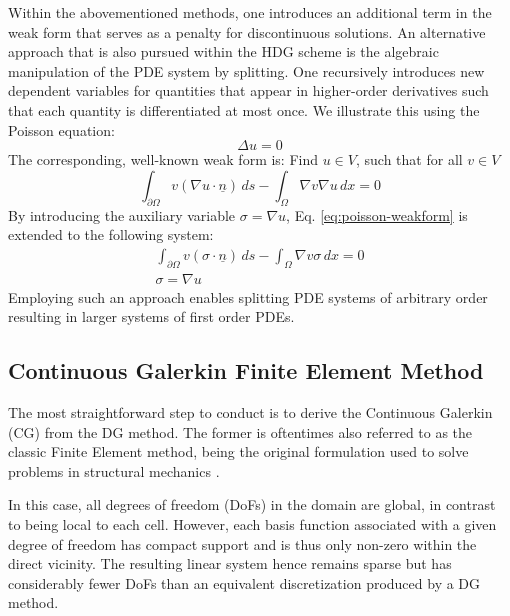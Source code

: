 \documentclass[asi,article,submit,moreauthors]{Definitions/mdpi}
\begin{document}
Within the abovementioned methods, one introduces an additional term in the weak form that serves as a penalty for discontinuous solutions.
An alternative approach that is also pursued within the HDG scheme is the algebraic manipulation of the PDE system by splitting.
One recursively introduces new dependent variables for quantities that appear in higher-order derivatives such that each quantity is differentiated at most once.
We illustrate this using the Poisson equation:
\begin{equation}
    \Delta u = 0
\end{equation}
The corresponding, well-known weak form is: Find $u \in V$, such that for all $v \in V$
\begin{equation}\label{eq:poisson-weakform}
    \int_{\partial\Omega} v (\nabla u \cdot \underline{n}) \,ds - \int_\Omega \nabla v \nabla u \,dx = 0
\end{equation}
By introducing the auxiliary variable $\sigma = \nabla u$, Eq. \ref{eq:poisson-weakform} is extended to the following system:
\begin{align}
    \int_{\partial\Omega} v (\sigma \cdot \underline{n}) \,ds - \int_\Omega \nabla v \sigma \,dx = 0 \\
    \sigma = \nabla u
\end{align}
Employing such an approach enables splitting PDE systems of arbitrary order resulting in larger systems of first order PDEs.

\subsection{Continuous Galerkin Finite Element Method}

The most straightforward step to conduct is to derive the Continuous Galerkin (CG) from the DG method.
The former is oftentimes also referred to as the classic Finite Element method, being the original formulation used to solve problems in structural mechanics \cite{liuEightyYearsFinite2022}.

In this case, all degrees of freedom (DoFs) in the domain are global, in contrast to being local to each cell.
However, each basis function associated with a given degree of freedom has compact support and is thus only non-zero within the direct vicinity.
The resulting linear system hence remains sparse but has considerably fewer DoFs than an equivalent discretization produced by a DG method.
\end{document}
